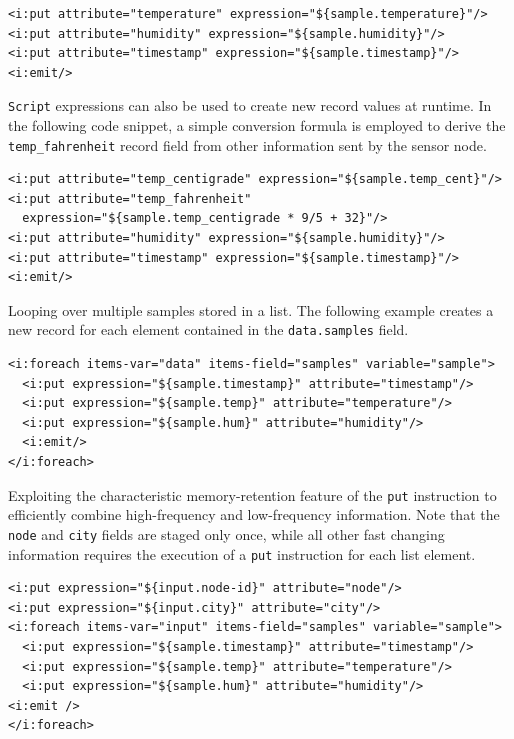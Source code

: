 \lstset{language=XML}
\begin{lstlisting}
<i:put attribute="temperature" expression="${sample.temperature}"/>
<i:put attribute="humidity" expression="${sample.humidity}"/>
<i:put attribute="timestamp" expression="${sample.timestamp}"/>
<i:emit/>
\end{lstlisting}

\texttt{Script} expressions can also be used to create new record values at
runtime. In the following code snippet, a simple conversion formula is employed
to derive the \texttt{temp\_fahrenheit} record field from other information
sent by the sensor node.

\lstset{language=XML}
\begin{lstlisting}
<i:put attribute="temp_centigrade" expression="${sample.temp_cent}"/>
<i:put attribute="temp_fahrenheit"
  expression="${sample.temp_centigrade * 9/5 + 32}"/>
<i:put attribute="humidity" expression="${sample.humidity}"/>
<i:put attribute="timestamp" expression="${sample.timestamp}"/>
<i:emit/>
\end{lstlisting}

Looping over multiple samples stored in a list. The following example creates a
new record for each element contained in the \texttt{data.samples} field. 

\lstset{language=XML}
\begin{lstlisting}
<i:foreach items-var="data" items-field="samples" variable="sample">
  <i:put expression="${sample.timestamp}" attribute="timestamp"/>
  <i:put expression="${sample.temp}" attribute="temperature"/>
  <i:put expression="${sample.hum}" attribute="humidity"/>
  <i:emit/>
</i:foreach>
\end{lstlisting}

Exploiting the characteristic memory-retention feature of the \texttt{put}
instruction to efficiently combine high-frequency and low-frequency
information. Note that the \texttt{node} and \texttt{city} fields are staged
only once, while all other fast changing information requires the execution of
a \texttt{put} instruction for each list element.

\lstset{language=XML}
\begin{lstlisting}
<i:put expression="${input.node-id}" attribute="node"/>
<i:put expression="${input.city}" attribute="city"/>
<i:foreach items-var="input" items-field="samples" variable="sample">
  <i:put expression="${sample.timestamp}" attribute="timestamp"/>
  <i:put expression="${sample.temp}" attribute="temperature"/>
  <i:put expression="${sample.hum}" attribute="humidity"/>
<i:emit />
</i:foreach> 
\end{lstlisting}

